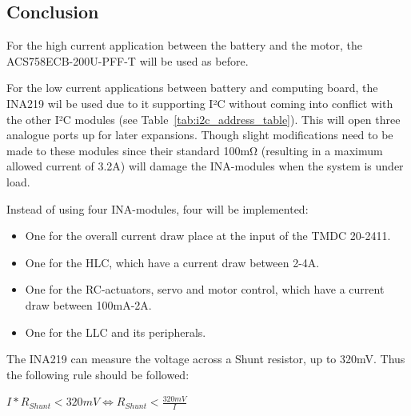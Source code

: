 \documentclass[ti,oneside,10pt]{uantwerpenreport}
\newcommand{\RmLstWS}[0]{\vspace{-6pt}} %
\begin{document}
\subsection{Conclusion}
For the high current application between the battery and the motor, the ACS758ECB-200U-PFF-T will be used as before.

For the low current applications between battery and computing board, the INA219 wil be used due to it supporting I²C without coming into conflict with the other I²C modules (see Table~\ref{tab:i2c_address_table}).
This will open three analogue ports up for later expansions.
Though slight modifications need to be made to these modules since their standard 100m\si{\ohm} (resulting in a maximum allowed current of 3.2A) will damage the INA-modules when the system is under load.

Instead of using four INA-modules, four will be implemented:
\RmLstWS
\begin{itemize}
    \item One for the overall current draw place at the input of the TMDC 20-2411.
    \item One for the HLC, which have a current draw between 2-4A.
    \item One for the RC-actuators, servo and motor control, which have a current draw between 100mA-2A.
    \item One for the LLC and its peripherals.
\end{itemize}

The INA219 can measure the voltage across a Shunt resistor, up to 320mV.
Thus the following rule should be followed:

\hspace{12pt} $I * R_{Shunt} < 320mV \Leftrightarrow R_{Shunt} < \frac{320mV}{I}$
\end{document}
